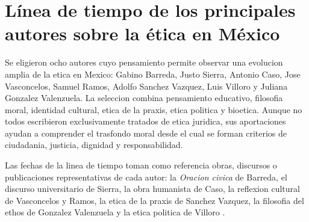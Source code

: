 \documentclass[
	spanish,
	letterpaper, oneside
]{article}
\begin{document}


\section{Línea de tiempo de los principales autores sobre la ética en México}


Se eligieron ocho autores cuyo pensamiento permite observar una evolucion amplia de la etica en Mexico: Gabino Barreda, Justo Sierra, Antonio Caso, Jose Vasconcelos, Samuel Ramos, Adolfo Sanchez Vazquez, Luis Villoro y Juliana Gonzalez Valenzuela. La seleccion combina pensamiento educativo, filosofia moral, identidad cultural, etica de la praxis, etica politica y bioetica. Aunque no todos escribieron exclusivamente tratados de etica juridica, sus aportaciones ayudan a comprender el trasfondo moral desde el cual se forman criterios de ciudadania, justicia, dignidad y responsabilidad.

Las fechas de la linea de tiempo toman como referencia obras, discursos o publicaciones representativas de cada autor: la \textit{Oracion civica} de Barreda, el discurso universitario de Sierra, la obra humanista de Caso, la reflexion cultural de Vasconcelos y Ramos, la etica de la praxis de Sanchez Vazquez, la filosofia del ethos de Gonzalez Valenzuela y la etica politica de Villoro \citep{barredaOracionCivica1867,sierraUniversidadNacional1910,casoExistencia1916,vasconcelosRazaCosmica1925,ramosPerfil1934,sanchezVazquezEtica1969,gonzalezEthosDestino1996,villoroPoderValor1997}.
\end{document}
